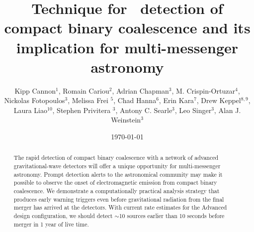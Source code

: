 \documentclass[showpacs,groupedaddress,showkeys,preprintnumbers]{iopart}
\begin{document}
\title[LLOID]{Technique for \earlywarning\ detection of compact binary coalescence and its implication for multi-messenger astronomy}

\date{\today}

\author{Kipp Cannon$^{1}$, Romain Cariou$^{2}$, Adrian Chapman$^3$, M.
Crispin-Ortuzar$^4$, Nickolas Fotopoulos$^3$, Melissa Frei $^5$, Chad
Hanna$^{6}$, Erin Kara$^{7}$, Drew Keppel$^{8,9}$, Laura Liao$^{10}$, Stephen
Privitera $^3$, Antony C.  Searle$^3$, Leo Singer$^3$, Alan J.  Weinstein$^3$}

\address{$^1$ Canadian Institute for Theoretical Astrophysics, Toronto, ON,
Canada}
\address{$^2$  D\'{e}partement de physique, \'{E}cole Normale Sup\'{e}rieure de Cachan, 61
Avenue du Pr\'{e}sident Wilson, 94235 Cachan Cedex, France}
\address{$^3$ LIGO Laboratory - California Institute of Technology, Pasadena,
CA, USA} 
\address{$^4$ Facultat de F\'{i}sica, Universitat de Val\`{e}ncia, E-46100 Burjassot,
Spain} 
\address{$^5$ The University of Texas at Austin, Austin, TX, USA}
\address{$^6$ Perimeter Institute for Theoretical Physics, Waterloo, ON,
Canada} 
\address{$^7$ Department of Physics and Astronomy, Barnard College, Columbia
University, New York, NY 10027, USA} 
\address{$^8$ Albert-Einstein-Institut, Max-Planck-Institut f\"{u}r
Gravitationphysik, Hannover, Germany} 
\address{$^9$ Leibniz Universit\"{a}t Hannover, Hannover, Germany}
\address{$^{10}$ Ryerson University, Toronto, ON, Canada}

\begin{abstract}
The rapid detection of compact binary coalescence with a network of advanced
gravitational-wave detectors will offer a unique opportunity for multi-messenger astronomy.  Prompt detection alerts to the astronomical community may make it possible to observe the onset of electromagnetic emission from compact binary coalescence.  We demonstrate a computationally practical analysis strategy that produces early warning triggers even before gravitational radiation from the final merger has arrived at the detectors.  With current rate estimates for the Advanced \LIGO{} design configuration, we should detect $\sim$10 sources earlier than 10 seconds before merger in 1 year of live time.
\end{abstract}


\end{document}
